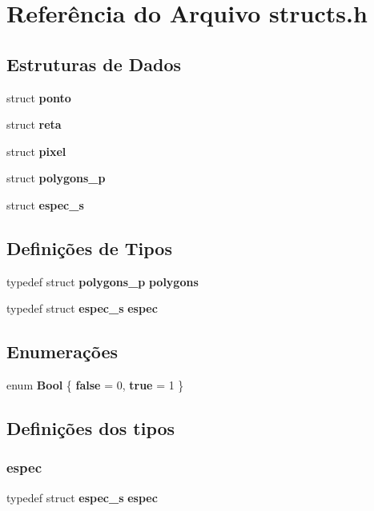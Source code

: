 \section{Referência do Arquivo structs.\+h}
\label{structs_8h}
\subsection*{Estruturas de Dados}
\begin{DoxyCompactItemize}
\item 
struct \textbf{ ponto}
\item 
struct \textbf{ reta}
\item 
struct \textbf{ pixel}
\item 
struct \textbf{ polygons\+\_\+p}
\item 
struct \textbf{ espec\+\_\+s}
\end{DoxyCompactItemize}
\subsection*{Definições de Tipos}
\begin{DoxyCompactItemize}
\item 
typedef struct \textbf{ polygons\+\_\+p} \textbf{ polygons}
\item 
typedef struct \textbf{ espec\+\_\+s} \textbf{ espec}
\end{DoxyCompactItemize}
\subsection*{Enumerações}
\begin{DoxyCompactItemize}
\item 
enum \textbf{ Bool} \{ \textbf{ false} = 0, 
\textbf{ true} = 1
 \}
\end{DoxyCompactItemize}


\subsection{Definições dos tipos}
\mbox{\label{structs_8h_abce6c2e773e33adffe85297769890614}} 
\subsubsection{espec}
{\footnotesize\ttfamily typedef struct \textbf{ espec\+\_\+s}  \textbf{ espec}}

